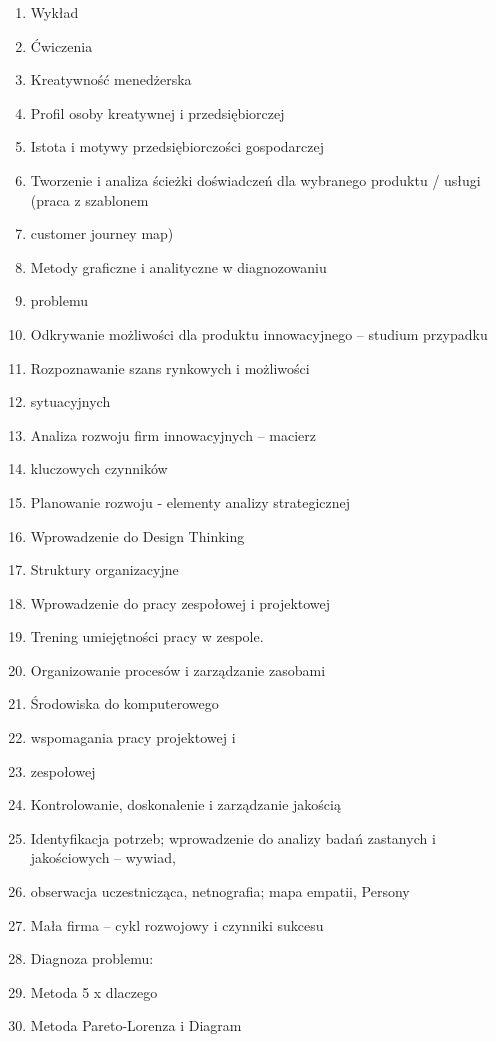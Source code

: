 \documentclass[12pt, a4paper]{article}
\begin{document}
\begin{enumerate}
  \item Wykład
  \item Ćwiczenia
  \item Kreatywność menedżerska
  \item Profil osoby kreatywnej i przedsiębiorczej
  \item Istota i motywy przedsiębiorczości gospodarczej
  \item Tworzenie i analiza ścieżki doświadczeń dla wybranego produktu / usługi (praca z szablonem
  \item customer journey map)
  \item Metody graficzne i analityczne w diagnozowaniu
  \item problemu
  \item Odkrywanie możliwości dla produktu innowacyjnego – studium przypadku
  \item Rozpoznawanie szans rynkowych i możliwości
  \item sytuacyjnych
  \item Analiza rozwoju firm innowacyjnych – macierz
  \item kluczowych czynników
  \item Planowanie rozwoju - elementy analizy strategicznej
  \item Wprowadzenie do Design Thinking
  \item Struktury organizacyjne
  \item Wprowadzenie do pracy zespołowej i projektowej
  \item Trening umiejętności pracy w zespole.
  \item Organizowanie procesów i zarządzanie zasobami
  \item Środowiska do komputerowego
  \item wspomagania pracy projektowej i
  \item zespołowej
  \item Kontrolowanie, doskonalenie i zarządzanie jakością
  \item Identyfikacja potrzeb; wprowadzenie do analizy badań zastanych i jakościowych – wywiad,
  \item obserwacja uczestnicząca, netnografia; mapa empatii, Persony
  \item Mała firma – cykl rozwojowy i czynniki sukcesu
  \item Diagnoza problemu:
  \item Metoda 5 x dlaczego
  \item Metoda Pareto-Lorenza i Diagram

\end{enumerate}
\end{document}
